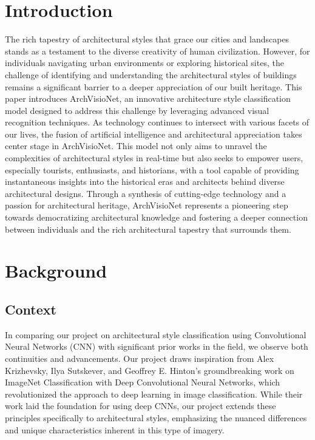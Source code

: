 \documentclass{article}
\begin{document}
\section{Introduction}
The rich tapestry of architectural styles that grace our cities and landscapes stands as a testament to the diverse creativity of human civilization. However, for individuals navigating urban environments or exploring historical sites, the challenge of identifying and understanding the architectural styles of buildings remains a significant barrier to a deeper appreciation of our built heritage. This paper introduces ArchVisioNet, an innovative architecture style classification model designed to address this challenge by leveraging advanced visual recognition techniques. As technology continues to intersect with various facets of our lives, the fusion of artificial intelligence and architectural appreciation takes center stage in ArchVisioNet. This model not only aims to unravel the complexities of architectural styles in real-time but also seeks to empower users, especially tourists, enthusiasts, and historians, with a tool capable of providing instantaneous insights into the historical eras and architects behind diverse architectural designs. Through a synthesis of cutting-edge technology and a passion for architectural heritage, ArchVisioNet represents a pioneering step towards democratizing architectural knowledge and fostering a deeper connection between individuals and the rich architectural tapestry that surrounds them.


\section{Background}
\subsection{Context}
In comparing our project on architectural style classification using Convolutional Neural Networks (CNN) with significant prior works in the field, we observe both continuities and advancements. Our project draws inspiration from Alex Krizhevsky, Ilya Sutskever, and Geoffrey E. Hinton's groundbreaking work on ImageNet Classification with Deep Convolutional Neural Networks, which revolutionized the approach to deep learning in image classification. While their work laid the foundation for using deep CNNs, our project extends these principles specifically to architectural styles, emphasizing the nuanced differences and unique characteristics inherent in this type of imagery.
\end{document}
